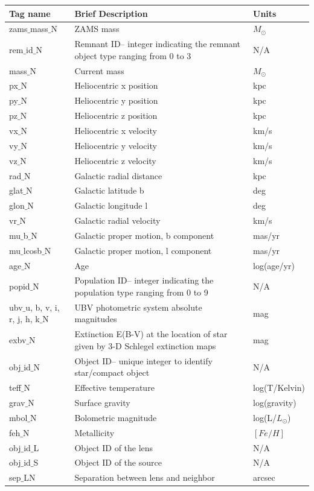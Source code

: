 \documentclass{scrartcl}
\begin{document}
\begin{table}[h]
\centering
{}
\begin{tabular}{ l | p{6.5cm} | p{3cm} }
    \textbf{Tag name} & \textbf{Brief Description} & \textbf{Units}  \\
    \hline
    zams$\_$mass$\_$N & ZAMS mass & $M_\odot$ \\
    rem$\_$id$\_$N & Remnant ID-- integer indicating the remnant object type ranging from 0 to 3 & N/A \\
    mass$\_$N & Current mass & $M_\odot$ \\
    px$\_$N & Heliocentric x position & kpc \\
    py$\_$N & Heliocentric y position & kpc \\
    pz$\_$N & Heliocentric z position & kpc \\
    vx$\_$N & Heliocentric x velocity & km/s \\
    vy$\_$N & Heliocentric y velocity & km/s \\
    vz$\_$N & Heliocentric z velocity & km/s \\
    rad$\_$N & Galactic radial distance & kpc \\
    glat$\_$N & Galactic latitude b & deg \\
    glon$\_$N & Galactic longitude l & deg \\
    vr$\_$N & Galactic radial velocity & km/s \\
    mu$\_$b$\_$N & Galactic proper motion, b component & mas/yr \\
    mu$\_$lcosb$\_$N & Galactic proper motion, l component & mas/yr \\
    age$\_$N & Age & log(age/yr) \\
    popid$\_$N & Population ID-- integer indicating the population type ranging from 0 to 9 & N/A \\
    ubv$\_$u, b, v, i, r, j, h, k$\_$N & UBV photometric system absolute magnitudes & mag \\
    exbv$\_$N & Extinction E(B-V) at the location of star given by 3-D Schlegel extinction maps & mag \\
    obj$\_$id$\_$N & Object ID-- unique integer to identify star/compact object & N/A \\
    teff$\_$N & Effective temperature & log(T/Kelvin) \\
    grav$\_$N & Surface gravity & log(gravity) \\
    mbol$\_$N & Bolometric magnitude & log(L/$L_\odot$) \\
    feh$\_$N & Metallicity &  $[Fe/H]$\\
    obj$\_$id$\_$L & Object ID of the lens & N/A \\
    obj$\_$id$\_$S & Object ID of the source & N/A \\
    sep$\_$LN & Separation between lens and neighbor & arcsec 
\end{tabular}
\end{table}
\end{document}

